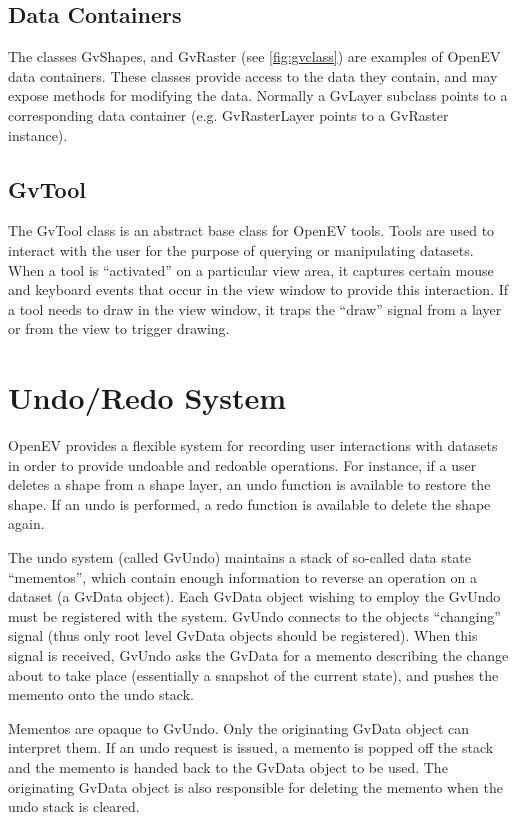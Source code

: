 \documentclass{openevreport}
\begin{document}
\section{Data Containers}

The classes GvShapes, and GvRaster (see \ref{fig:gvclass}) are examples of OpenEV
data containers.  These classes provide access to the data they
contain, and may expose methods for modifying the data.  Normally a
GvLayer subclass points to a corresponding data container
(e.g. GvRasterLayer points to a GvRaster instance).

\section{GvTool}

The GvTool class is an abstract base class for OpenEV tools.  Tools are
used to interact with the user for the purpose of querying or
manipulating datasets.  When a tool is ``activated'' on a particular
view area, it captures certain mouse and keyboard events that occur in
the view window to provide this interaction.  If a tool needs to draw
in the view window, it traps the ``draw'' signal from a layer or from
the view to trigger drawing.

\chapter{Undo/Redo System}

OpenEV provides a flexible system for recording user interactions with
datasets in order to provide undoable and redoable operations.  For
instance, if a user deletes a shape from a shape layer, an undo
function is available to restore the shape.  If an undo is performed,
a redo function is available to delete the shape again.

The undo system (called GvUndo) maintains a stack of so-called data
state ``mementos'', which contain enough information to reverse an
operation on a dataset (a GvData object).  Each GvData object wishing
to employ the GvUndo must be registered with the system.  GvUndo
connects to the objects ``changing'' signal (thus only root level
GvData objects should be registered).  When this signal is received,
GvUndo asks the GvData for a memento describing the change about to
take place (essentially a snapshot of the current state), and pushes
the memento onto the undo stack.

Mementos are opaque to GvUndo.  Only the originating GvData object
can interpret them.  If an undo request is issued, a memento is popped
off the stack and the memento is handed back to the GvData object to be
used.  The originating GvData object is also responsible for deleting
the memento when the undo stack is cleared.
\end{document}
